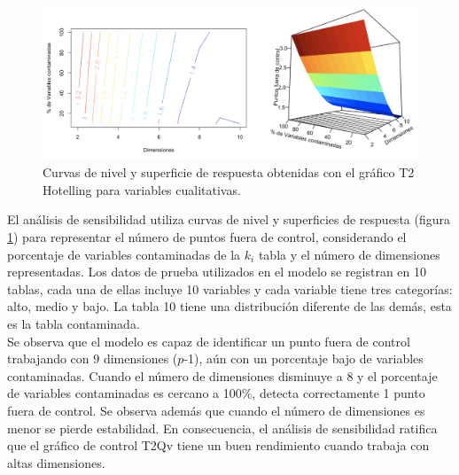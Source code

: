 \documentclass[water,article,submit,moreauthors,pdftex]{mdpi}
\begin{document}
\begin{figure}[!ht]



\begin{center}\includegraphics[width=0.8\linewidth,]{conjuntosensibilidad} \end{center}

\caption{Curvas de nivel y superficie de respuesta obtenidas con el gráfico T2 Hotelling para variables cualitativas.}

\label{fig:sensibilidad}
\end{figure}

El análisis de sensibilidad utiliza curvas de nivel y superficies de
respuesta (figura \ref{fig:sensibilidad}) para representar el número de
puntos fuera de control, considerando el porcentaje de variables
contaminadas de la \(k_i\) tabla y el número de dimensiones
representadas. Los datos de prueba utilizados en el modelo se registran
en 10 tablas, cada una de ellas incluye 10 variables y cada variable
tiene tres categorías: alto, medio y bajo. La tabla 10 tiene una
distribución diferente de las demás, esta es la tabla contaminada.\\
Se observa que el modelo es capaz de identificar un punto fuera de
control trabajando con 9 dimensiones (\(p\)-1), aún con un porcentaje
bajo de variables contaminadas. Cuando el número de dimensiones
disminuye a 8 y el porcentaje de variables contaminadas es cercano a
100\%, detecta correctamente 1 punto fuera de control. Se observa además
que cuando el número de dimensiones es menor se pierde estabilidad. En
consecuencia, el análisis de sensibilidad ratifica que el gráfico de
control T2Qv tiene un buen rendimiento cuando trabaja con altas
dimensiones.

%
\end{document}

